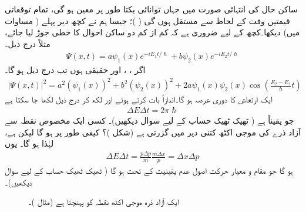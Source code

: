  ساکن حال کی انتہائی صورت میں جہاں توانائی یکتا طور پر معین ہو گی، تمام توقعاتی قیمتیں وقت کے لحاظ سے مستقل ہوں گی ( )؛ جیسا ہم نے کچھ دیر پہلے ( مساوات  میں) دیکھا۔کچھ  کے لیے ضروری ہے کہ کم از کم دو ساکن احوال کا خطی جوڑ لیا جائے، مثلاً درج ذیل۔ 
\begin{align*}
\Psi (x,t) = a\psi_{1}(x)e^{-iE_{1}t/\hslash} + b\psi_{2}(x)e^{-iE_{2}t/\hslash}
\end{align*}
اگر ، ،  اور حقیقی ہوں تب درج ذیل ہو گا۔
\begin{align*}
| \Psi(x,t)|^{2} = a^{2}(\psi_{1}(x))^{2} + b^{2}(\psi_{2}(x))^{2} + 2a\psi_{1}(x)\psi_{2}(x)\cos \left( \frac{E_{2}-E_{1}}{\hslash} t \right)
\end{align*}
ایک ارتعاش کا دوری عرصہ  ہو گا۔اندازاً بات کرتے ہوئے  اور  لکھ کر درج ذیل لکھا جا سکتا ہے
\begin{align*}
\Delta E \Delta t = 2\pi\hslash
\end{align*}
جو یقیناً  ہے ( ٹھیک ٹھیک حساب کے لیے سوال  دیکھیں)۔
 کسی ایک مخصوص نقطہ سے آزاد ذرے کی موجی اکٹھ کتنی دیر میں گزرتی ہے (شکل )؟ کیفی طور پر  ہو گا لیکن  ہے، لہٰذا  ہو گا۔ یوں 
\begin{align*}
\Delta E \Delta t = \frac{p\Delta p}{m} \frac{m\Delta x}{p} = \Delta x \Delta p
\end{align*}
ہو گا جو مقام و معیار حرکت اصول عدم یقینیت کے تحت  ہو گا ( ٹھیک ٹھیک حساب کے لیے سوال  دیکھیں)۔
\begin{figure}
\centering
{}
\caption{ایک آزاد ذرہ موجی اکٹھ نقطہ  کو پہنچتا ہے (مثال )۔}
\label{شکل_مثال_قواعد_رفتار_دورانیہ}
\end{figure}

